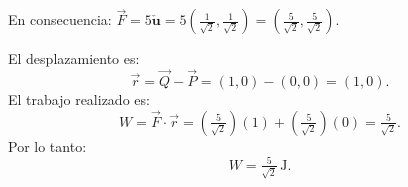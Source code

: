 \documentclass[11pt,a4paper]{article}
\begin{document}
\begin{enumerate}[\hspace{-5mm} 1) ]
\begin{itemize}
    
    En consecuencia: \quad $\vec{F} = 5 {\bm{\check{u}}} = 5\left(\tfrac{1}{\sqrt{2}}, \tfrac{1}{\sqrt{2}}\right) = \left(\tfrac{5}{\sqrt{2}}, \tfrac{5}{\sqrt{2}}\right).$ 

    
    El desplazamiento es:
    \[
    \vec{r} = \vec{Q} - \vec{P} = (1, 0) - (0, 0) = (1, 0).
    \]
    El trabajo realizado es:
    \[
    W = \vec{F} \cdot \vec{r} = \left(\tfrac{5}{\sqrt{2}}\right)(1) + \left(\tfrac{5}{\sqrt{2}}\right)(0) = \tfrac{5}{\sqrt{2}}.
    \]
    Por lo tanto:
    \[
    W = \tfrac{5}{\sqrt{2}}\,\text{J}.
    \]
\end{itemize}

\end{enumerate}
\end{document}
